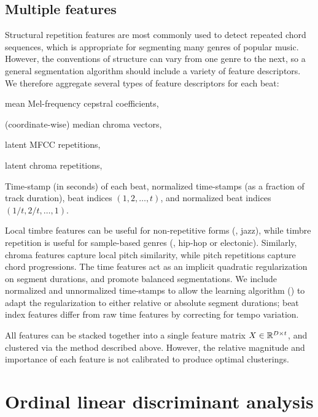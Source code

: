 \documentclass{article}
\begin{document}
\subsection{Multiple features}
Structural repetition features are most commonly used to detect repeated chord sequences, which is appropriate for
segmenting many genres of popular music.  However, the conventions of structure can vary from one genre to the next,
so a general segmentation algorithm should include a variety of feature descriptors.
We therefore aggregate several types of feature descriptors for each beat:
\begin{description}\addtolength{\itemsep}{-0.35\baselineskip}%
\item[Timbre] mean Mel-frequency cepstral coefficients,
\item[Pitch] (coordinate-wise) median chroma vectors,
\item[Timbre repetition] latent MFCC repetitions,
\item[Pitch repetition] latent chroma repetitions,
\item[Time] Time-stamp (in seconds) of each beat, normalized time-stamps (as a fraction of track duration), 
beat indices $(1, 2, \ldots, t)$, and normalized beat indices\\ $(1/t, 2/t, \ldots, 1)$.
\end{description}
Local timbre features can be useful for non-repetitive forms (\eg, jazz), while timbre repetition is useful for sample-based genres (\eg, hip-hop or electonic). 
Similarly, chroma features capture local pitch similarity, while pitch repetitions capture chord progressions.
The time features act as an implicit quadratic regularization on segment durations, and promote balanced segmentations. 
We include normalized and unnormalized time-stamps to allow the learning algorithm () to adapt the regularization to 
either relative or absolute segment durations; beat index features differ from raw time features by correcting for tempo variation.

All features can be stacked together into a single feature matrix $X \in \mathbb{R}^{D\times t}$, and clustered via the method described
above. However, the relative magnitude and importance of each feature is not calibrated to produce optimal clusterings. 

\section{Ordinal linear discriminant analysis}
%
\end{document}
